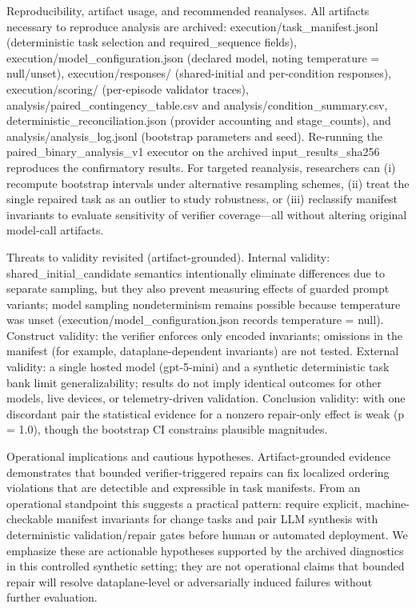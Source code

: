 \documentclass[conference]{IEEEtran}
\begin{document}
Reproducibility, artifact usage, and recommended reanalyses. All artifacts necessary to reproduce analysis are archived: execution/task\_manifest.jsonl (deterministic task selection and required\_sequence fields), execution/model\_configuration.json (declared model, noting temperature = null/unset), execution/responses/ (shared-initial and per-condition responses), execution/scoring/ (per-episode validator traces), analysis/paired\_contingency\_table.csv and analysis/condition\_summary.csv, deterministic\_reconciliation.json (provider accounting and stage\_counts), and analysis/analysis\_log.jsonl (bootstrap parameters and seed). Re-running the paired\_binary\_analysis\_v1 executor on the archived input\_results\_sha256 reproduces the confirmatory results. For targeted reanalysis, researchers can (i) recompute bootstrap intervals under alternative resampling schemes, (ii) treat the single repaired task as an outlier to study robustness, or (iii) reclassify manifest invariants to evaluate sensitivity of verifier coverage---all without altering original model-call artifacts.

Threats to validity revisited (artifact-grounded). Internal validity: shared\_initial\_candidate semantics intentionally eliminate differences due to separate sampling, but they also prevent measuring effects of guarded prompt variants; model sampling nondeterminism remains possible because temperature was unset (execution/model\_configuration.json records temperature = null). Construct validity: the verifier enforces only encoded invariants; omissions in the manifest (for example, dataplane-dependent invariants) are not tested. External validity: a single hosted model (gpt-5-mini) and a synthetic deterministic task bank limit generalizability; results do not imply identical outcomes for other models, live devices, or telemetry-driven validation. Conclusion validity: with one discordant pair the statistical evidence for a nonzero repair-only effect is weak (p = 1.0), though the bootstrap CI constrains plausible magnitudes.

Operational implications and cautious hypotheses. Artifact-grounded evidence demonstrates that bounded verifier-triggered repairs can fix localized ordering violations that are detectible and expressible in task manifests. From an operational standpoint this suggests a practical pattern: require explicit, machine-checkable manifest invariants for change tasks and pair LLM synthesis with deterministic validation/repair gates before human or automated deployment. We emphasize these are actionable hypotheses supported by the archived diagnostics in this controlled synthetic setting; they are not operational claims that bounded repair will resolve dataplane-level or adversarially induced failures without further evaluation.
\end{document}
